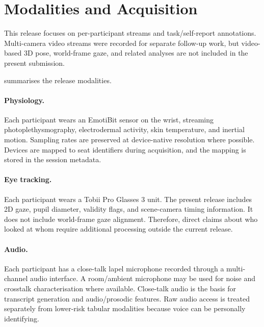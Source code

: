 \documentclass{article}
\begin{document}


\section{Modalities and Acquisition}
\label{sec:modalities}

This release focuses on per-participant streams and task/self-report
annotations.
Multi-camera video streams were recorded for separate follow-up work, but
video-based 3D pose, world-frame gaze, and related analyses are not included
in the present submission.

 summarises the release modalities.



\paragraph{Physiology.}
Each participant wears an EmotiBit sensor on the wrist, streaming
photoplethysmography, electrodermal activity, skin temperature, and inertial
motion.
Sampling rates are preserved at device-native resolution where possible.
Devices are mapped to seat identifiers during acquisition, and the mapping is
stored in the session metadata.

\paragraph{Eye tracking.}
Each participant wears a Tobii Pro Glasses 3 unit.
The present release includes 2D gaze, pupil diameter, validity flags, and
scene-camera timing information.
It does not include world-frame gaze alignment.
Therefore, direct claims about who looked at whom require additional processing
outside the current release.

\paragraph{Audio.}
Each participant has a close-talk lapel microphone recorded through a
multi-channel audio interface.
A room/ambient microphone may be used for noise and crosstalk
characterisation where available.
Close-talk audio is the basis for transcript generation and audio/prosodic
features.
Raw audio access is treated separately from lower-risk tabular modalities
because voice can be personally identifying.
\end{document}
